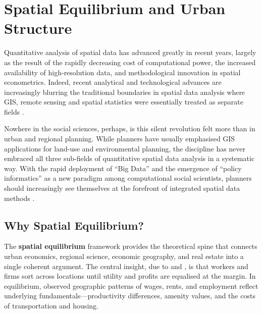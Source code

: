 
\chapter{Spatial Equilibrium and Urban Structure}
\label{chap_SpatialEquil}

Quantitative analysis of spatial data has advanced greatly in recent years,
largely as the result of the rapidly decreasing cost of computational power,
the increased availability of high-resolution data, and methodological
innovation in spatial econometrics. Indeed, recent analytical and
technological advances are increasingly blurring the traditional boundaries
in spatial data analysis where GIS,
remote sensing and spatial statistics were essentially treated as separate fields
\citep[e.g.][]{Davis2002a,O'Sullivan2003,Campbell2006}.

Nowhere in the social sciences, perhaps, is this silent revolution felt more
than in urban and regional planning. While planners have usually emphasised
GIS applications for land-use and environmental planning, the discipline has
never embraced all three sub-fields of quantitative spatial data analysis in
a systematic way. With the rapid deployment of ``Big Data''
and the emergence of ``policy informatics'' as a new
paradigm among computational social scientists, planners should increasingly
see themselves at the forefront of integrated spatial data methods
\citep{Anselin2012,Barrett2011}.

\section{Why Spatial Equilibrium?}
\label{sec_WhySpatEq}

The \textbf{spatial equilibrium} framework provides
the theoretical spine that connects urban economics, regional science,
economic geography, and real estate into a single coherent argument. The
central insight, due to \citet{Rosen1979} and \citet{Roback1982}, is that
workers and firms sort across locations until utility and profits are equalised
at the margin. In equilibrium, observed geographic patterns of wages, rents,
and employment reflect underlying fundamentals---productivity differences,
amenity values, and the costs of transportation and housing.

